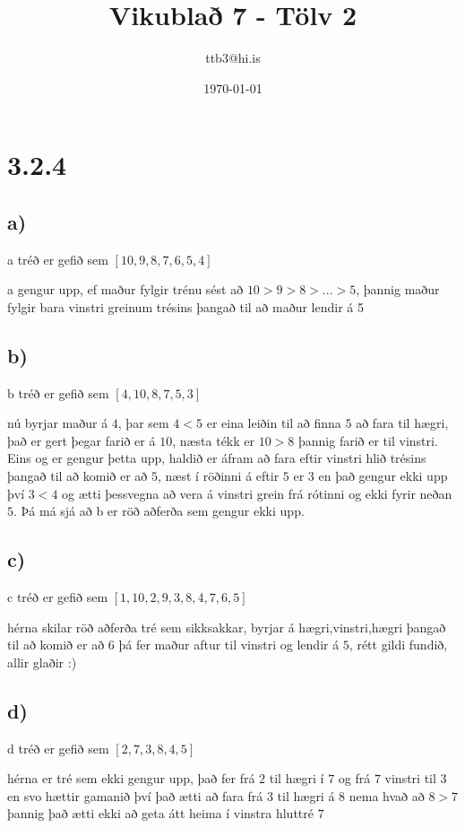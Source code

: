 \documentclass{article}
\title{Vikublað 7 - Tölv 2}
\author{ttb3@hi.is}
\date{\today}
\begin{document}
\maketitle


\section*{3.2.4}
\subsection*{a)}
a tréð er gefið sem $[10,9,8,7,6,5,4]$

a gengur upp, ef maður fylgir trénu sést að $10 > 9 > 8 > ... > 5$, þannig maður fylgir bara vinstri greinum trésins þangað til að maður lendir á 5

\subsection*{b)}
b tréð er gefið sem $[4,10,8,7,5,3]$

nú byrjar maður á $4$, 
þar sem $4<5$ er eina leiðin til að finna $5$ að fara til hægri, 
það er gert þegar farið er á $10$, 
næsta tékk er $10>8$ þannig farið er til vinstri. 
Eins og er gengur þetta upp,
haldið er áfram að fara eftir vinstri hlið trésins þangað til að komið er að $5$,
næst í röðinni á eftir $5$ er $3$ en það gengur ekki upp því $3<4$ og ætti þessvegna að vera á vinstri grein frá rótinni og ekki fyrir neðan $5$.
Þá má sjá að b er röð aðferða sem gengur ekki upp.

\subsection*{c)}
c tréð er gefið sem $[1,10,2,9,3,8,4,7,6,5]$

hérna skilar röð aðferða tré sem sikksakkar, byrjar á hægri,vinstri,hægri
þangað til að komið er að $6$ þá fer maður aftur til vinstri og lendir á $5$,
rétt gildi fundið, allir glaðir :)

\subsection*{d)}
d tréð er gefið sem $[2,7,3,8,4,5]$

hérna er tré sem ekki gengur upp, það fer frá $2$ til hægri í $7$ og frá $7$
vinstri til $3$ en svo hættir gamanið því það ætti að fara frá $3$ til hægri á $8$
nema hvað að $8>7$ þannig það ætti ekki að geta átt heima í vinstra hluttré $7$
\end{document}
